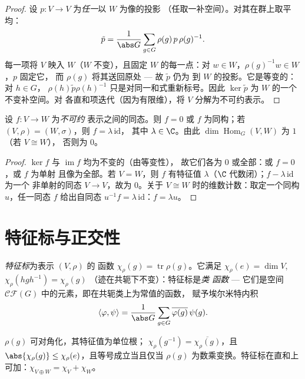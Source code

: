 \begin{proof}
设 $p \colon V \to V$ 为\emph{任一}以 $W$ 为像的投影
（任取一补空间）。对其在群上取平均：
\[
\tilde p = \frac1{\abs G}\sum_{g \in G} \rho(g)\,p\,\rho(g)^{-1}.
\]
每一项将 $V$ 映入 $W$（$W$ 不变），且固定 $W$
的每一点：对 $w \in W$，$\rho(g)^{-1}w \in W$，$p$ 固定它，
而 $\rho(g)$ 将其送回原处 --- 故 $\tilde p$ 仍为
到 $W$ 的投影。它是等变的：对 $h \in G$，
$\rho(h)\tilde p\rho(h)^{-1}$ 只是对同一和式重新标号。因此 $\ker
\tilde p$ 为 $W$ 的一个不变补空间。对
各直和项迭代（因为有限维），将 $V$ 分解为不可约表示。
\end{proof}

\begin{theorem}[舒尔引理]\label{thm:b3:representations:schur}
设 $f \colon V \to W$ 为\emph{不可约}
表示之间的同态。则 $f = 0$ 或 $f$ 为同构；若
$(V,\rho) = (W,\sigma)$，则 $f = \lambda\,\mathrm{id}$，
其中 $\lambda \in \C$。由此
$\dim\operatorname{Hom}_G(V, W)$ 为 $1$（若 $V \cong W$），
否则为 $0$。
\end{theorem}

\begin{proof}
$\ker f$ 与 $\operatorname{im} f$ 均为不变的（由等变性），
故它们各为 $0$ 或全部：或 $f = 0$，或 $f$ 为单射
且像为全部。若 $V = W$，则 $f$ 有特征值 $\lambda$（$\C$
代数闭）；$f - \lambda\,\mathrm{id}$ 为一个
非单射的同态 $V \to V$，故为 $0$。关于
$V \cong W$ 时的维数计数：取定一个同构 $u$，任一同态
$f$ 给出自同态 $u^{-1}f = \lambda\,\mathrm{id}$：$f =
\lambda u$。
\end{proof}

\section{特征标与正交性}

\begin{definition}\label{def:b3:representations:character}
\emph{特征标}为表示 $(V, \rho)$ 的
函数 $\chi_\rho(g) = \operatorname{tr}\rho(g)$。它满足
$\chi_\rho(e) = \dim V$, $\chi_\rho(hgh^{-1}) = \chi_\rho(g)$
（迹在共轭下不变）：特征标是\emph{类
函数} --- 它们是空间
$\mathcal{CF}(G)$ 中的元素，即在共轭类上为常值的函数，
赋予埃尔米特内积
\[
\langle \varphi, \psi\rangle = \frac1{\abs G}\sum_{g \in G}
\overline{\varphi(g)}\,\psi(g).
\]
\end{definition}

\begin{proposition}\label{prop:b3:representations:charbasics}
$\rho(g)$ 可对角化，其特征值为单位根；
$\chi_\rho(g^{-1}) = \overline{\chi_\rho(g)}$，且
$\abs{\chi_\rho(g)} \leq \chi_\rho(e)$，且等号成立当且仅当
$\rho(g)$ 为数乘变换。特征标在直和上可加：$\chi_{V
\oplus W} = \chi_V + \chi_W$。
\end{proposition}

